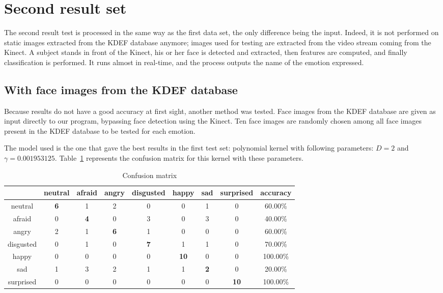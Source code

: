 \section{Second result set}

\vspace{\baselineskip}
\noindent The second result test is processed in the same way as the first data set, the only difference being the input. Indeed, it is not performed on static images extracted from the KDEF database anymore; images used for testing are extracted from the video stream coming from the Kinect. A subject stands in front of the Kinect, his or her face is detected and extracted, then features are computed, and finally classification is performed. It runs almost in real-time, and the process outputs the name of the emotion expressed.
\newline

\subsection{With face images from the KDEF database}

\vspace{\baselineskip}
\noindent Because results do not have a good accuracy at first sight, another method was tested. Face images from the KDEF database are given as input directly to our program, bypassing face detection using the Kinect. Ten face images are randomly chosen among all face images present in the KDEF database to be tested for each emotion. 
\newline

\noindent The model used is the one that gave the best results in the first test set: polynomial kernel with following parameters: $ D = 2 $ and $ \gamma = 0.001953125 $. Table~\ref{table_results_confusion_matrix_offline} represents the confusion matrix for this kernel with these parameters.
\newline

\begin{table}[h]
\begin{center}
   \caption{\label{table_results_confusion_matrix_offline} Confusion matrix}
\begin{tabular}{|c|c|c|c|c|c|c|c|c|}
  \hline
   & neutral & afraid & angry & disgusted & happy & sad & surprised & accuracy \\
  \hline
  neutral & \textbf{6} & 1 & 2 & 0 & 0 & 1 & 0 & 60.00\% \\
  afraid & 0 & \textbf{4} & 0 & 3 & 0 & 3 & 0 & 40.00\% \\
  angry & 2 & 1 & \textbf{6} & 1 & 0 & 0 & 0 & 60.00\% \\
  disgusted & 0 & 1 & 0 & \textbf{7} & 1 & 1 & 0 & 70.00\% \\
  happy & 0 & 0 & 0 & 0 & \textbf{10} & 0 & 0 & 100.00\% \\
  sad & 1 & 3 & 2 & 1 & 1 & \textbf{2} & 0 & 20.00\% \\
  surprised & 0 & 0 & 0 & 0 & 0 & 0 & \textbf{10} & 100.00\%\\
  \hline
\end{tabular}
\end{center}
\end{table}

